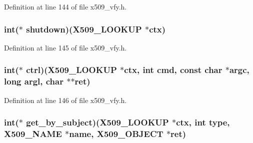 Definition at line 144 of file x509\+\_\+vfy.\+h.

\subsubsection[{\texorpdfstring{shutdown}{shutdown}}]{\setlength{\rightskip}{0pt plus 5cm}int($\ast$ shutdown)({\bf X509\+\_\+\+L\+O\+O\+K\+UP} $\ast$ctx)}\hypertarget{structx509__lookup__method__st_a7c73b4174fc8fd50b0a5dbc9f0569997}{}\label{structx509__lookup__method__st_a7c73b4174fc8fd50b0a5dbc9f0569997}


Definition at line 145 of file x509\+\_\+vfy.\+h.

\subsubsection[{\texorpdfstring{ctrl}{ctrl}}]{\setlength{\rightskip}{0pt plus 5cm}int($\ast$ ctrl)({\bf X509\+\_\+\+L\+O\+O\+K\+UP} $\ast$ctx, int cmd, const char $\ast$argc, long argl, char $\ast$$\ast$ret)}\hypertarget{structx509__lookup__method__st_a1b459c870696ceaeac69c157c13ade6d}{}\label{structx509__lookup__method__st_a1b459c870696ceaeac69c157c13ade6d}


Definition at line 146 of file x509\+\_\+vfy.\+h.

\subsubsection[{\texorpdfstring{get\+\_\+by\+\_\+subject}{get_by_subject}}]{\setlength{\rightskip}{0pt plus 5cm}int($\ast$ get\+\_\+by\+\_\+subject)({\bf X509\+\_\+\+L\+O\+O\+K\+UP} $\ast$ctx, int {\bf type}, {\bf X509\+\_\+\+N\+A\+ME} $\ast${\bf name}, {\bf X509\+\_\+\+O\+B\+J\+E\+CT} $\ast$ret)}\hypertarget{structx509__lookup__method__st_a8e01859808d19e7d40838c2262b14821}{}\label{structx509__lookup__method__st_a8e01859808d19e7d40838c2262b14821}


